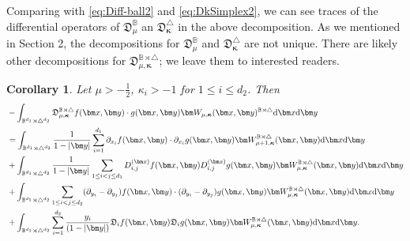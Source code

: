 \documentclass{amsart}
\newtheorem{cor}[thm]{Corollary}
\theoremstyle{remark}
\def\d{\mathrm{d}}
\def\fD{{\mathfrak D}}
\def\k{{\kappa}}
\def\BB{{\mathbb B}}
\def\bk{{\boldsymbol{\kappa}}}
\def\f{\frac}
\begin{document}
Comparing with \eqref{eq:Diff-ball2} and \eqref{eq:DkSimplex2}, we can see traces of the differential operators of $\fD_\mu^\BB$ an
$\fD_\bk^\triangle$ in the above decomposition. As we mentioned in Section 2, the decompositions for $\fD_\mu^\BB$ and 
$\fD_\bk^\triangle$ are not unique. There are likely other decompositions for $\fD_{\mu,\bk}^{\BB\rtimes \triangle}$; we leave
them to interested readers. 

\begin{cor}\label{cor:self-adjBT}
Let  $\mu > -\f12$, $\k_i > -1$ for $1 \le i \le d_2$.  Then
\begin{align} \label{eq:self-adjBT}
   & - \int_{\BB^{d_1} \rtimes \triangle^{d_2}}\fD_{\mu, \bk}^{\BB\rtimes \triangle}
        f (\bm x,\bm y) \cdot g(\bm x, \bm y) \bm W_{\mu, \bk}(\bm x, \bm y)^{\BB\rtimes \triangle} \d \bm x \d \bm y  \\
  &  = \int_{\BB^{d_1} \rtimes \triangle^{d_2}}  \frac{1}{1-|\bm y|} \sum_{i=1}^{d_1} \partial_{x_i} f(\bm x,\bm y)\cdot \partial_{x_i} g(\bm x,\bm y) 
  \bm W_{\mu+1,\bk}^{\BB\rtimes \triangle}(\bm x,\bm y)  \d \bm x \d \bm y  \notag \\ 
  & +  \int_{\BB^{d_1} \rtimes \triangle^{d_2}}  \frac{1}{1-|\bm y|} \sum_{1 \le i< j \le d_1}  D_{i,j}^{(\bm x)} f(\bm x, \bm y)  D_{i,j}^{(\bm x)} g(\bm x, \bm y) 
  \bm W_{\mu,\bk}^{\BB\rtimes \triangle}(\bm x,\bm y)  \d \bm x \d \bm y  \notag \\ 
  & + \int_{\BB^{d_1} \rtimes \triangle^{d_2}}   \sum_{1\le i< j \le d_2} (\partial_{y_i} - \partial_{y_j}) f(\bm x,\bm y) \cdot 
    (\partial_{y_i} - \partial_{y_j})g(\bm x,\bm y)
  \bm W_{\mu,\bk}^{\BB\rtimes \triangle}(\bm x,\bm y) \d \bm x \d \bm y  \notag \\
  &  +  \int_{\BB^{d_1} \rtimes \triangle^{d_2}} \sum_{i=1}^{d_2} \frac{y_i}{(1-|\bm y|)}  \fD_i f(\bm x,\bm y) 
 \fD_i g(\bm x,\bm y) 
  \bm W_{\mu,\bk}^{\BB\rtimes \triangle}(\bm x,\bm y)  \d \bm x \d \bm y.  \notag
 \end{align}
\end{cor} 
\end{document}
